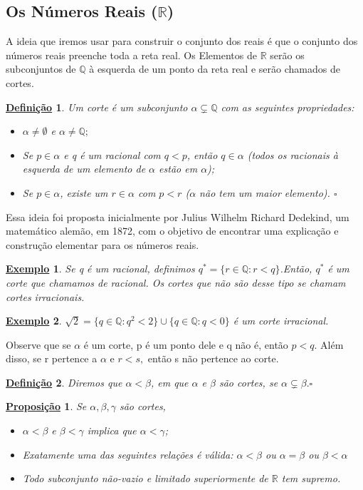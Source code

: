 \documentclass{article}
\newtheorem*{def*}{\underline{Defini\c c\~ao}}
\newtheorem*{prop*}{\underline{Proposi\c c\~ao}}
\newtheorem{example}{\underline{Exemplo}}
\begin{document}
\subsection{Os N\'umeros Reais ($\mathbb{R}$)}
  A ideia que iremos usar para construir o conjunto dos reais \'e que o conjunto dos n\'umeros reais preenche toda a reta real. Os Elementos
de $\mathbb{R}$ ser\~ao os subconjuntos de $\mathbb{Q}$ \`a esquerda de um ponto da reta real e ser\~ao chamados de cortes.
 \begin{def*}
   Um corte \'e um subconjunto $\alpha\subsetneq \mathbb{Q}$ com as seguintes propriedades:
  \begin{itemize}
    \item[i)] $\alpha\neq \emptyset$ e $\alpha \neq \mathbb{Q};$
    \item[ii)] Se $p\in \alpha$ e q \'e um racional com $q < p$, ent\~ao $q\in \alpha$ (todos os racionais \`a esquerda de um elemento
      de $\alpha$ est\~ao em $\alpha$);
    \item[iii)] Se $p\in \alpha$, existe um $r\in \alpha$ com $p < r$ ($\alpha$ n\~ao tem um maior elemento). $\square$
  \end{itemize}
 \end{def*}
  Essa ideia foi proposta inicialmente por Julius Wilhelm Richard Dedekind, um matem\'atico alem\~ao, em 1872, com o objetivo de encontrar uma explica\c c\~ao
e constru\c c\~ao elementar para os n\'umeros reais.
\begin{example}
  Se q \'e um racional, definimos $q^{*} = \{r\in \mathbb{Q}: r < q\}$.Ent\~ao, $q^{*}$ \'e um corte que chamamos de racional. Os 
cortes que n\~ao s\~ao desse tipo se chamam cortes irracionais.
\end{example}
\begin{example}
  $\sqrt{2} = \{q\in \mathbb{Q}: q^{2} < 2\}\cup \{q\in \mathbb{Q}: q < 0\}$ \'e um corte irracional.
\end{example}
  Observe que se $\alpha$ \'e um corte, p \'e um ponto dele e q n\~ao \'e, ent\~ao $p < q$. Al\'em disso, se r pertence a $\alpha$
e $r < s,$ ent\~ao s n\~ao pertence ao corte.
\begin{def*}
  Diremos que $\alpha < \beta$, em que $\alpha$ e $\beta$ s\~ao cortes, se $\alpha\subsetneq \beta.\square$
\end{def*}
\begin{prop*}
  Se $\alpha, \beta, \gamma$ s\~ao cortes,
 \begin{itemize}
   \item[i)] $\alpha < \beta$ e $\beta < \gamma$ implica que $\alpha < \gamma$;
   \item[ii)] Exatamente uma das seguintes rela\c c\~oes \'e v\'alida: $\alpha < \beta$ ou $\alpha = \beta$ ou $\beta < \alpha$
   \item[iii)] Todo subconjunto n\~ao-vazio e limitado superiormente de $\mathbb{R}$ tem supremo.
 \end{itemize}
\end{prop*}
\newpage
\end{document}
